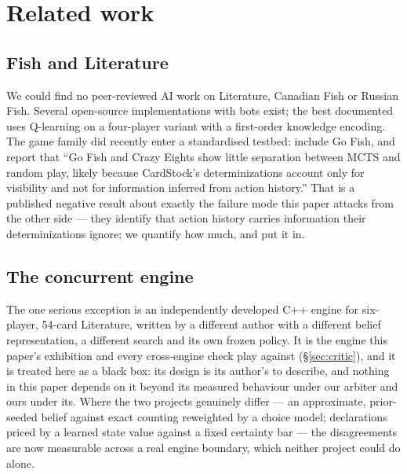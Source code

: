 \documentclass[11pt,letterpaper]{article}
\begin{document}
\section{Related work}
\label{sec:related}

\subsection{Fish and Literature}
 We could find no peer-reviewed AI work on
Literature, Canadian Fish or Russian Fish. Several open-source implementations
with bots exist; the best documented uses Q-learning on a four-player variant
with a first-order knowledge encoding. The game family did recently enter a
standardised testbed: \citet{goadrich2026valet} include Go Fish, and report that
``Go Fish and Crazy Eights show little separation between MCTS and random play,
likely because CardStock's determinizations account only for visibility and not
for information inferred from action history.'' That is a published negative
result about exactly the failure mode this paper attacks from the other side ---
they identify that action history carries information their determinizations
ignore; we quantify how much, and put it in.

\subsection{The concurrent engine}
 The one serious exception is an independently developed C++ engine for
six-player, 54-card Literature, written by a different author with a different
belief representation, a different search and its own frozen policy. It is the
engine this paper's exhibition and every cross-engine check play against
(\S\ref{sec:critic}), and it is treated here as a black box: its design is its
author's to describe, and nothing in this paper depends on it beyond its
measured behaviour under our arbiter and ours under its. Where the two
projects genuinely differ --- an approximate, prior-seeded belief against exact
counting reweighted by a choice model; declarations priced by a learned state
value against a fixed certainty bar --- the disagreements are now measurable
across a real engine boundary, which neither project could do alone.
\end{document}
